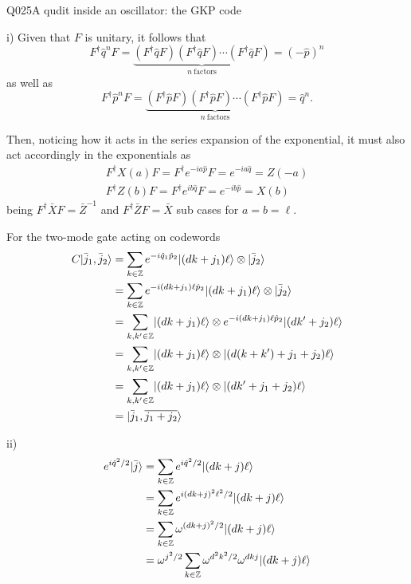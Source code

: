 \begin{entry}{Q025}{A qudit inside an oscillator: the GKP code}
\begin{solution}[Part (d)]
i)
Given that $F$ is unitary, it follows that 
$$F^\dagger\hat q^n F= \underbrace{(F^\dagger \hat qF) (F^\dagger \hat qF) \cdots (F^\dagger \hat qF)}_{n\ \text{factors}}=(-\hat p)^n$$ as well as 
$$F^\dagger\hat p^n F= \underbrace{(F^\dagger \hat pF) (F^\dagger \hat pF) \cdots (F^\dagger \hat p F)}_{n\ \text{factors}}=\hat q^n.$$

Then, noticing how it acts in the series expansion of the exponential, it must also act accordingly in the exponentials as
\begin{equation}
\begin{split}
     F^\dagger X(a)F= F^\dagger e^{-ia\hat p}F= e^{-ia\hat q} = Z(-a)\\
     F^\dagger Z(b)F= F^\dagger e^{ib\hat q}F= e^{-ib\hat p} = X(b)
\end{split}
\end{equation}
being $F^\dagger \bar XF = \bar Z^{-1}$ and $F^\dagger \bar ZF = \bar X$ sub cases for $a=b=\ell$.

For the two-mode gate acting on codewords
\begin{equation}
    \begin{split}
        C\lvert \bar j_1, \bar j_2 \rangle &= \sum_{k\in\mathbb{Z}} e^{-i\hat q_1 \hat p_2}\lvert (dk+j_1)\ell \rangle \otimes \lvert \bar j_2 \rangle \\
        &= \sum_{k\in\mathbb{Z}} e^{-i(dk+j_1)\ell\hat  p_2}\lvert (dk+j_1)\ell \rangle \otimes \lvert \bar j_2 \rangle\\
        &= \sum_{k,k'\in\mathbb{Z}} \lvert (dk+j_1)\ell \rangle \otimes e^{-i(dk+j_1)\ell\hat  p_2} \lvert (dk'+j_2)\ell \rangle\\
        &= \sum_{k,k'\in\mathbb{Z}} \lvert (dk+j_1)\ell \rangle \otimes \lvert (d(k+k')+j_1+j_2)\ell \rangle\\ 
        &= \sum_{k,k'\in\mathbb{Z}} \lvert (dk+j_1)\ell \rangle \otimes \lvert (dk'+j_1+j_2)\ell \rangle\\ 
        &= \lvert \bar j_1, \overline{j_1 +j_2} \rangle
    \end{split}
\end{equation}

ii) 
\begin{equation}
    \begin{split}
        e^{i\hat q^2/2} \lvert \bar j \rangle &= \sum_{k\in\mathbb{Z}} e^{i\hat q^2/2}\lvert (dk+j)\ell \rangle\\
        &=  \sum_{k\in\mathbb{Z}} e^{i(dk+j)^2\ell^2/2}\lvert (dk+j)\ell \rangle\\
        &=  \sum_{k\in\mathbb{Z}} \omega^{(dk+j)^2/2}\lvert (dk+j)\ell \rangle\\
        &=  \omega^{j^2/2} \sum_{k\in\mathbb{Z}} \omega^{d^2k^2/2} \omega^{dk j}\lvert (dk+j)\ell \rangle
    \end{split}
\end{equation}


\end{solution}
\end{entry}
